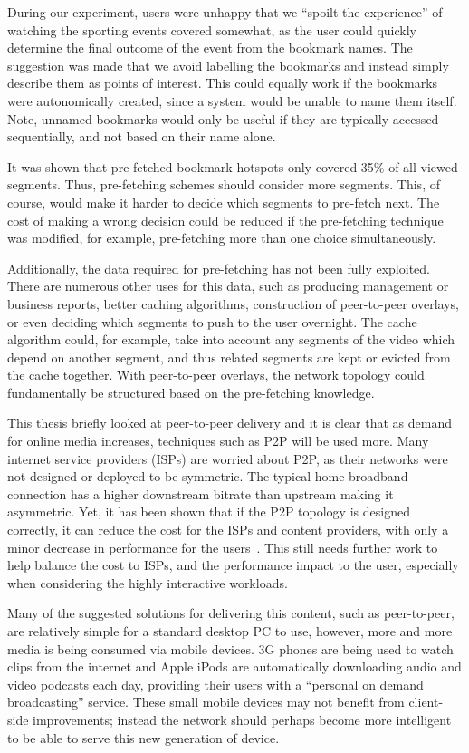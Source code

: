     During our experiment, users were unhappy that we ``spoilt the experience'' of watching the sporting events covered somewhat, as the user could quickly determine the final outcome of the event from the bookmark names. The suggestion was made that we avoid labelling the bookmarks and instead simply describe them as points of interest. This could equally work if the bookmarks were autonomically created, since a system would be unable to name them itself. Note, unnamed bookmarks would only be useful if they are typically accessed sequentially, and not based on their name alone.

    It was shown that pre-fetched bookmark hotspots only covered 35\% of all viewed segments. Thus, pre-fetching schemes should consider more segments. This, of course, would make it harder to decide which segments to pre-fetch next. The cost of making a wrong decision could be reduced if the pre-fetching technique was modified, for example, pre-fetching more than one choice simultaneously.

    Additionally, the data required for pre-fetching has not been fully exploited. There are numerous other uses for this data, such as producing management or business reports, better caching algorithms, construction of peer-to-peer overlays, or even deciding which segments to push to the user overnight. The cache algorithm could, for example, take into account any segments of the video which depend on another segment, and thus related segments are kept or evicted from the cache together.  With peer-to-peer overlays, the network topology could fundamentally be structured based on the pre-fetching knowledge.

    This thesis briefly looked at peer-to-peer delivery and it is clear that as demand for online media increases, techniques such as P2P will be used more. Many internet service providers (ISPs) are worried about P2P, as their networks were not designed or deployed to be symmetric. The typical home broadband connection has a higher downstream bitrate than upstream making it asymmetric. Yet, it has been shown that if the P2P topology is designed correctly, it can reduce the cost for the ISPs and content providers, with only a minor decrease in performance for the users~\cite{karagiannis2005sis,huang2007civ}. This still needs further work to help balance the cost to ISPs, and the performance impact to the user, especially when considering the highly interactive workloads.

    Many of the suggested solutions for delivering this content, such as peer-to-peer, are relatively simple for a standard desktop PC to use, however, more and more media is being consumed via mobile devices. 3G phones are being used to watch clips from the internet and Apple iPods are automatically downloading audio and video podcasts each day, providing their users with a ``personal on demand broadcasting'' service. These small mobile devices may not benefit from client-side improvements; instead the network should perhaps become more intelligent to be able to serve this new generation of device.

